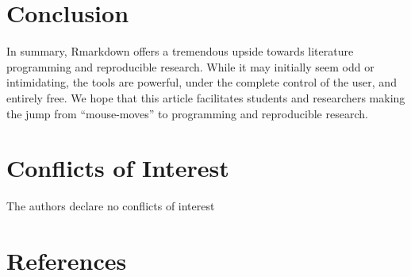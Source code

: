 \documentclass[]{elsarticle} %
\begin{document}
\hypertarget{conclusion}{%
\section{Conclusion}\label{conclusion}}

In summary, Rmarkdown offers a tremendous upside towards literature
programming and reproducible research. While it may initially seem odd
or intimidating, the tools are powerful, under the complete control of
the user, and entirely free. We hope that this article facilitates
students and researchers making the jump from ``mouse-moves'' to
programming and reproducible research.

\hypertarget{conflicts-of-interest}{%
\section{Conflicts of Interest}\label{conflicts-of-interest}}

The authors declare no conflicts of interest

\hypertarget{references}{%
\section*{References}\label{references}}
\end{document}
